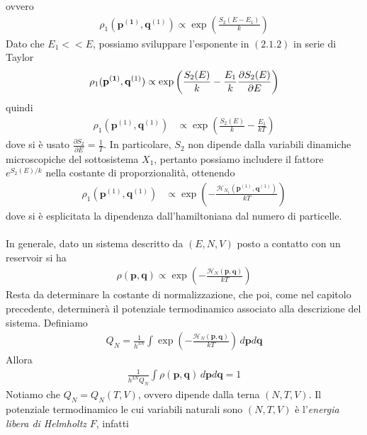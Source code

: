\documentclass{article}
\begin{document}
ovvero
\begin{align}
    \rho_1(\mathbf{p^{(1)}}, \mathbf{q}^{(1)}) \propto \exp\left(\frac{S_2(E - E_1)}{k}\right) \tag{2.1.1}
\end{align}
Dato che $E_1 << E$, possiamo sviluppare l'esponente in $(2.1.2)$ in serie di Taylor
\begin{align}
    \rho_1(\mathbf{p^{(1)}}, \mathbf{q}^{(1)}) \propto \exp\left(\frac{S_2(E)}{k} - \frac{E_1}{k}\frac{\partial S_2(E)}{\partial E}\right) \notag
\end{align}
quindi
\begin{align}
    \rho_1(\mathbf{p}^{(1)}, \mathbf{q}^{(1)}) &\propto \exp\left(\frac{S_2(E)}{k}-\frac{E_1}{kT}\right) \tag{2.1.2}
\end{align}
dove si è usato $\frac{\partial S_2}{\partial E} = \frac{1}{T}$. In particolare, $S_2$ non dipende dalla variabili dinamiche microscopiche del sottosistema $X_1$, pertanto possiamo includere il fattore $e^{S_2(E)/k}$ nella costante di proporzionalità, ottenendo
\begin{align}
    \rho_1(\mathbf{p}^{(1)}, \mathbf{q}^{(1)}) &\propto \exp\left(-\frac{\mathcal{H}_{N_1}(\mathbf{p}^{(1)}, \mathbf{q}^{(1)})}{kT}\right) \tag{2.1.3}
\end{align}
dove si è esplicitata la dipendenza dall'hamiltoniana dal numero di particelle. \\ \\
In generale, dato un sistema descritto da $(E, N, V)$ posto a contatto con un reservoir si ha 
\begin{align}
    \rho(\mathbf{p}, \mathbf{q}) \propto \exp\left(-\frac{\mathcal{H}_N(\mathbf{p}, \mathbf{q})}{kT}\right) \tag{2.1.4}
\end{align}
Resta da determinare la costante di normalizzazione, che poi, come nel capitolo precedente, determinerà il potenziale termodinamico associato alla descrizione del sistema. Definiamo 
\begin{align}
    Q_N = \frac{1}{h^{3N}}\int \exp\left(-\frac{\mathcal{H}_N(\mathbf{p}, \mathbf{q})}{kT}\right) \, d\mathbf{p}d\mathbf{q} \tag{2.1.5}
\end{align}
Allora 
\begin{align}
    \frac{1}{h^{3N}Q_N}\int \rho(\mathbf{p}, \mathbf{q}) \, d\mathbf{p}d\mathbf{q} = 1 \tag{2.1.6}
\end{align}
Notiamo che $Q_N = Q_N(T, V)$, ovvero dipende dalla terna $(N, T, V)$. Il potenziale termodinamico le cui variabili naturali sono $(N, T, V)$ è l'\textit{energia libera di Helmholtz} $F$, infatti 
\end{document}
